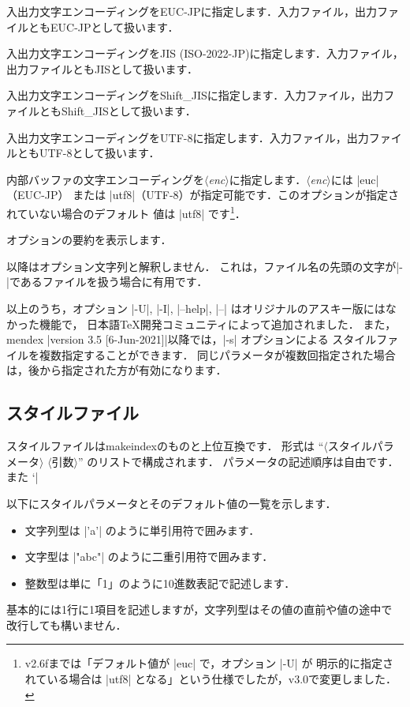 \documentclass[a4paper,dvipdfmx]{jsarticle}
\newcommand{\SoftName}[1]{\textsf{#1}}
\newcommand{\Meta}[1]{$\langle$\mbox{}\textit{#1}\mbox{}$\rangle$}
\newcommand{\jMeta}[1]{$\langle$\mbox{}\textsf{#1}\mbox{}$\rangle$}
\begin{document}
\begin{description}[leftmargin=2cm]
\item[|-E|]
入出力文字エンコーディングをEUC-JPに指定します．入力ファイル，出力ファイルともEUC-JPとして扱います．

\item[|-J|]
入出力文字エンコーディングをJIS (ISO-2022-JP)に指定します．入力ファイル，出力ファイルともJISとして扱います．

\item[|-S|]
入出力文字エンコーディングをShift\_JISに指定します．入力ファイル，出力ファイルともShift\_JISとして扱います．

\item[|-U|]
入出力文字エンコーディングをUTF-8に指定します．入力ファイル，出力ファイルともUTF-8として扱います．

\item[|-I| \Meta{enc}]
内部バッファの文字エンコーディングを\Meta{enc}に指定します．\Meta{enc}には |euc|（EUC-JP）
または |utf8|（UTF-8）が指定可能です．このオプションが指定されていない場合のデフォルト
値は |utf8| です\footnote{v2.6fまでは「デフォルト値が |euc| で，オプション |-U| が
明示的に指定されている場合は |utf8| となる」という仕様でしたが，v3.0で変更しました．}．

\item[|--help|]
オプションの要約を表示します．

\item[|--|]
以降はオプション文字列と解釈しません．
これは，ファイル名の先頭の文字が|-|であるファイルを扱う場合に有用です．
\end{description}

以上のうち，オプション |-U|, |-I|, |--help|, |--| はオリジナルのアスキー版にはなかった機能で，
日本語\TeX 開発コミュニティによって追加されました．
また，\SoftName{mendex} |version 3.5 [6-Jun-2021]|以降では，|-s| オプションによる
スタイルファイルを複数指定することができます．
同じパラメータが複数回指定された場合は，後から指定された方が有効になります．

\subsection{スタイルファイル}

スタイルファイルは\SoftName{makeindex}のものと上位互換です．
形式は ``\jMeta{スタイルパラメータ} \jMeta{引数}'' のリストで構成されます．
パラメータの記述順序は自由です．また `|%

以下にスタイルパラメータとそのデフォルト値の一覧を示します．
\begin{itemize}
 \item 文字列型は |'a'| のように単引用符で囲みます．
 \item 文字型は |"abc"| のように二重引用符で囲みます．
 \item 整数型は単に「1」のように10進数表記で記述します．
\end{itemize}
基本的には1行に1項目を記述しますが，文字列型はその値の直前や値の途中で
改行しても構いません．
\end{document}
